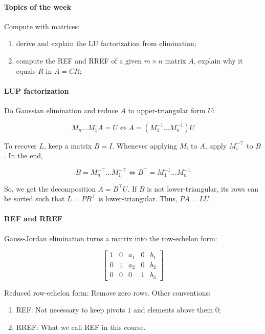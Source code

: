 \documentclass{article}
\begin{document}
\paragraph{Topics of the week} Compute with matrices:  

\begin{enumerate}
    \item derive and explain the LU factorization from elimination;
    \item compute the REF and RREF of a given $m \times n$ matrix $A$, explain why it equals $R$ in $A=CR$;
\end{enumerate}

\paragraph{LUP factorization} Do Gaussian elimination and reduce $A$ to upper-triangular form $U$:

$$
M_n \dots M_1 A = U \iff A = (M_1^{-1} \dots M_n^{-1}) U
$$

To recover $L$, keep a matrix $B = I$. Whenever applying $M_i$ to $A$, apply $M_i^{-\top}$ to $B$. In the end,

$$
B = M_n^{-\top} \dots M_1^{-\top} \iff B^\top = M_1^{-1} \dots M_n^{-1}
$$

So, we get the decomposition $A = B^\top U$. If $B$ is not lower-triangular, its rows can be sorted such that $L = P B^\top$ is lower-triangular. Thus, $PA = LU$.

\paragraph{REF and RREF} Gauss-Jordan elimination turns a matrix into the row-echelon form:

$$
\begin{bmatrix}
1 & 0 & a_1 & 0 & b_1 \\
0 & 1 & a_2 & 0 & b_2 \\
0 & 0 & 0 & 1 & b_3
\end{bmatrix}
$$

Reduced row-echelon form: Remove zero rows. Other conventions:

\begin{enumerate}
    \item REF: Not necessary to keep pivots $1$ and elements above them $0$;
    \item RREF: What we call REF in this course.
\end{enumerate}
\end{document}
